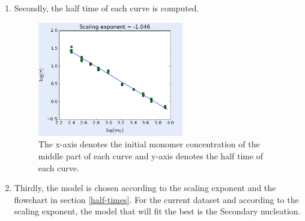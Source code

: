 \documentclass[11pt,a4paper]{article}
\begin{document}
\begin{enumerate}
  \item Secondly, the half time of each curve is computed.
    \begin{figure}[H]
    \centering
    \includegraphics[width=0.6\textwidth]{Images/half_plot_amylofit.png}
    \caption{The x-axis denotes the initial monomer concentration of the middle part of each curve and y-axis denotes the half time of each curve.}
    \label{fig: sample trajectory}
    \end{figure}

  \item Thirdly, the model is chosen according to the scaling exponent and the flowchart in section \ref{half-times}.
  For the current dataset and according to the scaling exponent, the model that will fit the best is the Secondary nucleation.


\end{enumerate}
\end{document}

